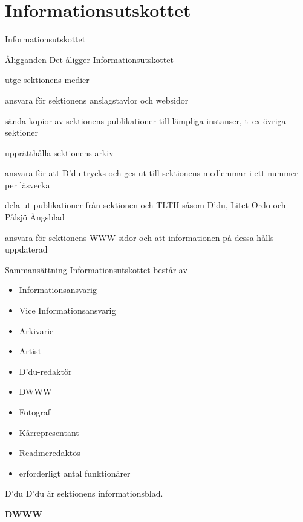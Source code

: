 \documentclass[pdfbookmarks,a4paper,11pt]{article}
\newlength{\itemcollength}
\newenvironment{reglemlista}{%
  \begin{list}{}{%
      \setlength{\labelwidth}{\itemcollength}%
      \setlength{\leftmargin}{\labelwidth + \labelsep}%
      \renewcommand{\makelabel}[1]{%
        \raisebox{0pt}[1ex][0pt]{%
          \makebox[\labelwidth][l]{%
            \parbox[t]{\itemcollength}{%
              \raggedright\hspace{0pt}##1}}}\hfill}%
      }}{%
  \end{list}}
\begin{document}
\section{Informationsutskottet}Informationsutskottet

\begin{reglemlista}

  \item[Åligganden]
    Det åligger Informationsutskottet
    \begin{attlista}
      \item utge sektionens medier
      \item ansvara för sektionens anslagstavlor och websidor
      \item sända kopior av sektionens publikationer till lämpliga instanser, t~ex övriga sektioner
      \item upprätthålla sektionens arkiv
      \item ansvara för att D'du trycks och ges ut till sektionens medlemmar i ett nummer per läsvecka
      \item dela ut publikationer från sektionen och TLTH såsom D'du, Litet Ordo och Pålsjö Ängsblad
      \item ansvara för sektionens WWW-sidor och att informationen på dessa hålls uppdaterad
    \end{attlista}

     \item[Sammansättning]
    Informationsutskottet består av
    \begin{itemize}
      \item Informationsansvarig
      \item Vice Informationsansvarig
      \item Arkivarie
      \item Artist
      \item D'du-redaktör
      \item DWWW
      \item Fotograf
      \item Kårrepresentant
      \item Readmeredaktös
      \item erforderligt antal funktionärer
    \end{itemize}

  \item[D'du]
    D'du är sektionens informationsblad.

    \item[\textbf{DWWW}]


\end{reglemlista}
\end{document}
